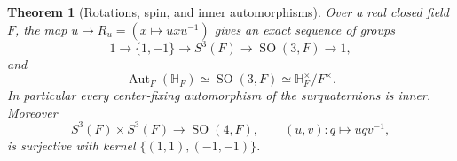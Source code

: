 \documentclass[11pt,letterpaper]{article}
\numberwithin{equation}{section}
\newtheorem{theorem}{Theorem}[section]
\theoremstyle{definition}
\theoremstyle{remark}
\newcommand{\HF}{\mathbb H_F}
\newcommand{\Aut}{\operatorname{Aut}}
\newcommand{\SO}{\operatorname{SO}}
\begin{document}
\begin{theorem}[Rotations, spin, and inner automorphisms]\label{squat:thm:rotations}
Over a real closed field $F$, the map $u\mapsto R_u=(x\mapsto uxu^{-1})$ gives an exact
sequence of groups
\begin{equation}\label{squat:eq:spin3}
 1\longrightarrow\{1,-1\}\longrightarrow S^3(F)\longrightarrow\SO(3,F)\longrightarrow1,
\end{equation}
and
\[
 \Aut_F(\HF)\simeq\SO(3,F)\simeq\HF^\times/F^\times .
\]
In particular every center-fixing automorphism of the surquaternions is inner. Moreover
\begin{equation}\label{squat:eq:spin4}
 S^3(F)\times S^3(F)\longrightarrow\SO(4,F),\qquad (u,v):q\longmapsto uqv^{-1},
\end{equation}
is surjective with kernel $\{(1,1),(-1,-1)\}$.
\end{theorem}
\end{document}
